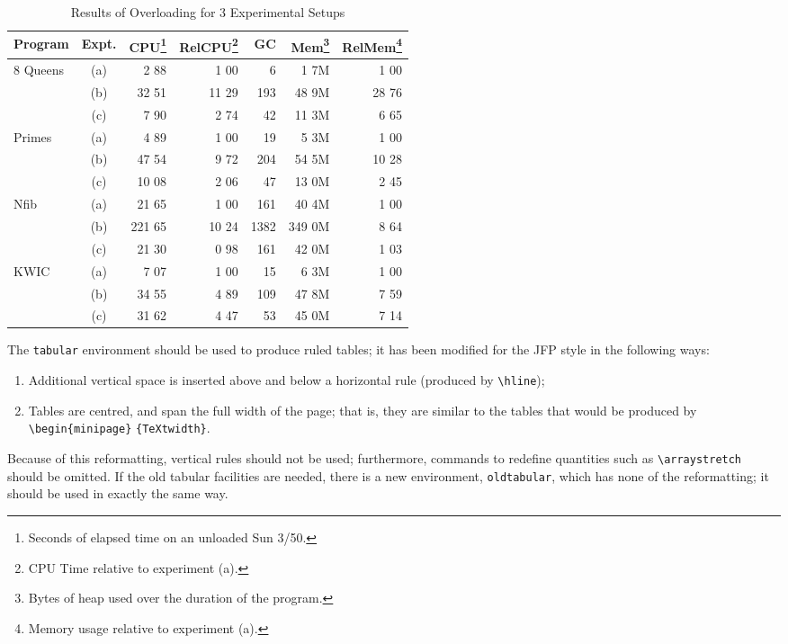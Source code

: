 \documentclass{jfp}
\begin{document}
\begin{table}[h!]
  \caption{Results of Overloading for 3 Experimental Setups}
 \begin{tabular}{@{\extracolsep{\fill}}lcrrrrr}
    \hline
    Program& Expt.&
     CPU\footnote{Seconds of elapsed time on an unloaded Sun 3/50.}&
     RelCPU\footnote{CPU Time relative to experiment (a).}&
     GC& Mem\footnote{Bytes of heap used over the duration of the program.}&
     RelMem\footnote{Memory usage relative to experiment (a).}\\
    \hline
    8 Queens& (a)&   2 88&  1 00&    6&   1 7M&  1 00\\
    &         (b)&  32 51& 11 29&  193&  48 9M& 28 76\\
    &         (c)&   7 90&  2 74&   42&  11 3M&  6 65\\
    Primes&   (a)&   4 89&  1 00&   19&   5 3M&  1 00\\
    &         (b)&  47 54&  9 72&  204&  54 5M& 10 28\\
    &         (c)&  10 08&  2 06&   47&  13 0M&  2 45\\
    Nfib&     (a)&  21 65&  1 00&  161&  40 4M&  1 00\\
    &         (b)& 221 65& 10 24& 1382& 349 0M&  8 64\\
    &         (c)&  21 30&  0 98&  161&  42 0M&  1 03\\
    KWIC&     (a)&   7 07&  1 00&   15&   6 3M&  1 00\\
    &         (b)&  34 55&  4 89&  109&  47 8M&  7 59\\
    &         (c)&  31 62&  4 47&   53&  45 0M&  7 14\\
    \hline
    \end{tabular}
   \label{sample-table}
\end{table}

The \verb"tabular" environment should be used to produce ruled tables;
it has been modified for the JFP style in the following ways:
\begin{enumerate}
  \item Additional vertical space is inserted above and below a horizontal rule
        (produced by \verb"\hline");
  \item Tables are centred, and span the full width of the page; that is,
  they are similar to the tables that would be produced by
  \verb"\begin{minipage}" \verb"{TeXtwidth}".
\end{enumerate}
Because of this reformatting, vertical rules should not be used;
furthermore, commands to
redefine quantities such as \verb"\arraystretch" should be omitted. If
the old tabular facilities are needed, there is a new environment,
\verb"oldtabular", which has none of the reformatting; it should be used
in exactly the same way.
\end{document}
